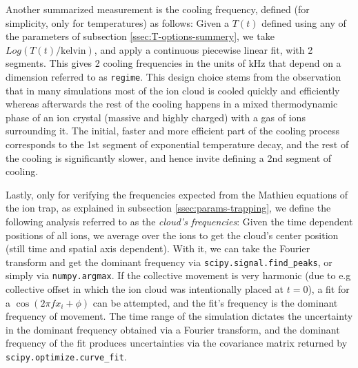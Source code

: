 Another summarized measurement is the cooling frequency, defined (for simplicity, only for temperatures) as follows: Given a $T(t)$ defined using any of the parameters of subsection \ref{ssec:T-options-summery}, we take $Log(T(t)/\mathrm{kelvin})$, and apply a continuous piecewise linear fit\cite{pwlf}, with 2 segments. This gives 2 cooling frequencies in the units of $\mathrm{kHz}$ that depend on a dimension referred to as \texttt{regime}. This design choice stems from the observation that in many simulations most of the ion cloud is cooled quickly and efficiently whereas afterwards the rest of the cooling happens in a mixed thermodynamic phase of an ion crystal (massive and highly charged) with a gas of ions surrounding it. The initial, faster and more efficient part of the cooling process corresponds to the 1st segment of exponential temperature decay, and the rest of the cooling is significantly slower, and hence invite defining a 2nd segment of cooling.

Lastly, only for verifying the frequencies expected from the Mathieu equations of the ion trap, as explained in subsection \ref{ssec:params-trapping}, we define the following analysis referred to as the \textit{cloud's frequencies}: Given the time dependent positions of all ions, we average over the ions to get the cloud's center position (still time and spatial axis dependent). With it, we can take the Fourier transform and get the dominant frequency via \texttt{scipy.signal.find\_peaks}\cite{scipy}, or simply via \texttt{numpy.argmax}\cite{numpy}. If the collective movement is very harmonic (due to e.g collective offset in which the ion cloud was intentionally placed at $t=0$), a fit for a $\cos(2\pi f x_i + \phi)$ can be attempted, and the fit's frequency is the dominant frequency of movement. The time range of the simulation dictates the uncertainty in the dominant frequency obtained via a Fourier transform, and the dominant frequency of the fit produces uncertainties via the covariance matrix returned by \texttt{scipy.optimize.curve\_fit}.
